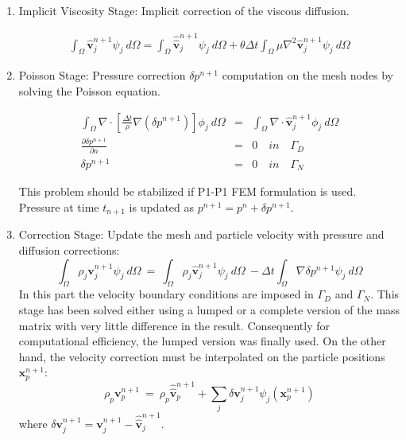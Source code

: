 \begin{enumerate}
  \item Implicit Viscosity Stage: Implicit correction of the viscous diffusion.

 \begin{eqnarray}\label{Step4a}
\displaystyle \int_{\Omega} \widehat{\mathbf{v}}^{n+1}_{j}\psi_j\ d\Omega =\int_{\Omega} \widehat{\widehat{\mathbf{v}}}^{n+1}_{j}\psi_j\  d\Omega + \theta \Delta t \int_{\Omega} \mu \nabla^{2}\widehat{\mathbf{v}}^{n+1}_{j} \psi_j\ d\Omega
\end{eqnarray}



 \item Poisson Stage: Pressure correction $\delta p^{n+1}$ computation on the mesh nodes by solving the Poisson equation.


 \begin{eqnarray}\label{Step5a}
   \int_{\Omega} \nabla \cdot \left[\frac{\Delta t}{\rho}\nabla(\delta p^{n+1})\right] \phi_j\ d\Omega &=& \int_{\Omega} \nabla \cdot \widehat{\mathbf{v}}_j^{n+1} \phi_j\ d\Omega \\
   \frac{\partial \delta p^{n+1}}{\partial n} &=& 0 \quad in \quad \Gamma_D \\
   \delta p^{n+1} &=& 0 \quad in \quad \Gamma_N
 \end{eqnarray}

 This problem should be stabilized if P1-P1 FEM formulation is used\cite{Idelsohn12b}. Pressure at time $t_{n+1}$ is updated as $p^{n+1}=p^{n}+\delta p^{n+1}$.


 \item Correction Stage: Update the mesh and particle velocity with pressure and diffusion corrections:
 \begin{equation}\label{Step6a}
  \int_{\Omega} \rho_j \mathbf{v}_j^{n+1}\psi_j\ d\Omega \ = \ \int_{\Omega} \rho_j  \widehat{\mathbf{v}}_j^{n+1}\psi_j\ d\Omega\ - \Delta t \int_{\Omega}  \nabla \delta p^{n+1}\psi_j\ d\Omega
 \end{equation}
 In this part the velocity boundary conditions are imposed in $\Gamma_D$ and $\Gamma_N$. This stage has been solved either using a lumped or a complete version of the mass matrix with very little difference in the result. Consequently for computational efficiency, the lumped version was finally used. On the other hand, the velocity correction must be interpolated on the particle positions $\mathbf{x}_{p}^{n+1}$:
  \begin{equation}\label{Step6b}
  \rho_p \mathbf{v}_p^{n+1}\  = \ \rho_p \widehat{\widehat{\mathbf{v}}}_p^{n+1} + \sum_{j} \delta \mathbf{v}_j^{n+1} \psi_j(\mathbf{x}_{p}^{n+1})
  \end{equation}
  where $\delta \mathbf{v}_j^{n+1} = \mathbf{v}_j^{n+1}-\widehat{\widehat{\mathbf{v}}}_j^{n+1}$.

\end{enumerate}

